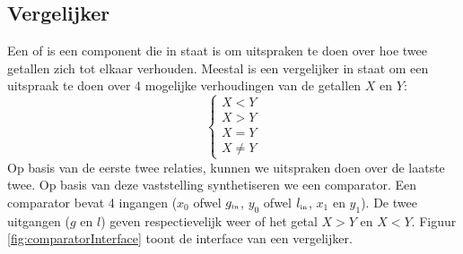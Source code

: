\subsection{Vergelijker}
\label{ss:comparator}
Een  of  is een component die in staat is om uitspraken te doen over hoe twee getallen zich tot elkaar verhouden. Meestal is een vergelijker in staat om een uitspraak te doen over 4 mogelijke verhoudingen van de getallen $X$ en $Y$:
\begin{equation}
\left\{\begin{array}{c}
X<Y\\
X>Y\\
X=Y\\
X\neq Y
\end{array}\right.
\end{equation}
Op basis van de eerste twee relaties, kunnen we uitspraken doen over de laatste twee. Op basis van deze vaststelling synthetiseren we een comparator. Een comparator bevat 4 ingangen ($x_0$ ofwel $g_{\mbox{\tiny{in}}}$, $y_0$ ofwel $l_{\mbox{\tiny{in}}}$, $x_1$ en $y_1$). De twee uitgangen ($g$ en $l$) geven respectievelijk weer of het getal $X>Y$ en $X<Y$. Figuur \ref{fig:comparatorInterface} toont de interface van een vergelijker.
